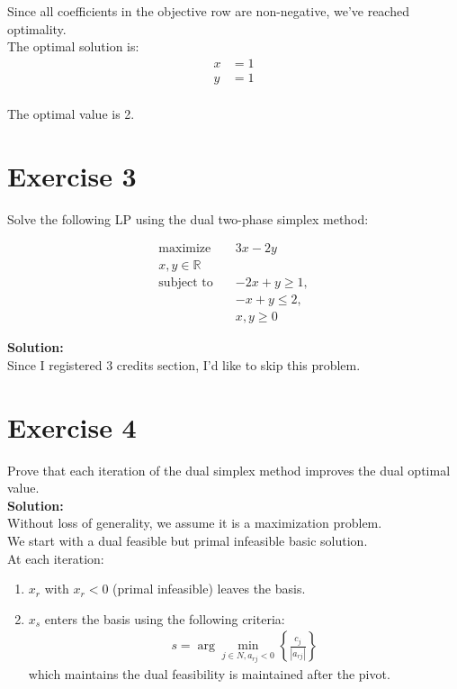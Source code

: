 \documentclass{article}
\begin{document}
Since all coefficients in the objective row are non-negative, we've reached optimality. \\

The optimal solution is:
\begin{align*}
x &= 1\\
y &= 1\\
\end{align*}

The optimal value is 2.

\newpage

\section*{Exercise 3}
Solve the following LP using the dual two-phase simplex method:

\begin{align*}
\text{maximize} \quad & 3x - 2y\\
x, y \in \mathbb{R} \quad & \\
\text{subject to} \quad & -2x + y \geq 1,\\
& -x + y \leq 2,\\
& x, y \geq 0
\end{align*}

\textbf{Solution:} \\

Since I registered 3 credits section, I'd like to skip this problem.

\newpage

\section*{Exercise 4}
Prove that each iteration of the dual simplex method improves the dual optimal value. \\

\textbf{Solution:} \\

Without loss of generality, we assume it is a maximization problem. \\

We start with a dual feasible but primal infeasible basic solution. \\

At each iteration:
\begin{enumerate}
    \item $x_r$ with $x_r < 0$ (primal infeasible) leaves the basis.
    \item $x_s$ enters the basis using the following criteria:
\begin{align*}
s = \arg\min_{j \in N, a_{rj} < 0} \left\{ \frac{c_j}{|a_{rj}|} \right\}
\end{align*}
which maintains the dual feasibility is maintained after the pivot.
\end{enumerate}
\end{document}
